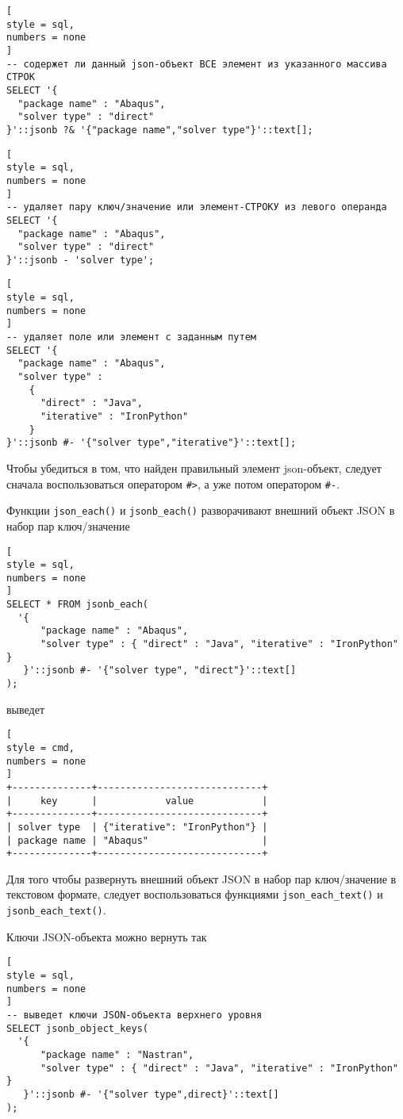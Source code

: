 \documentclass[%
	11pt,
	a4paper,
	utf8,
		]{article}
\begin{document}
\begin{lstlisting}[
style = sql, 
numbers = none
]
-- содержет ли данный json-объект ВСЕ элемент из указанного массива СТРОК
SELECT '{
  "package name" : "Abaqus",
  "solver type" : "direct"
}'::jsonb ?& '{"package name","solver type"}'::text[];
\end{lstlisting}

\begin{lstlisting}[
style = sql, 
numbers = none
]
-- удаляет пару ключ/значение или элемент-СТРОКУ из левого операнда 
SELECT '{
  "package name" : "Abaqus",
  "solver type" : "direct"
}'::jsonb - 'solver type';
\end{lstlisting}

\begin{lstlisting}[
style = sql, 
numbers = none
]
-- удаляет поле или элемент с заданным путем
SELECT '{
  "package name" : "Abaqus",
  "solver type" :
    {
      "direct" : "Java",
      "iterative" : "IronPython"
    }
}'::jsonb #- '{"solver type","iterative"}'::text[];
\end{lstlisting}

Чтобы убедиться в том, что найден правильный элемент json-объект, следует сначала воспользоваться оператором \verb|#>|, а уже потом оператором \verb|#-|.

Функции \texttt{json\_each()} и \texttt{jsonb\_each()} разворачивают внешний объект JSON в набор пар ключ/значение
\begin{lstlisting}[
style = sql, 
numbers = none
]
SELECT * FROM jsonb_each(
  '{
      "package name" : "Abaqus",
      "solver type" : { "direct" : "Java", "iterative" : "IronPython" }
   }'::jsonb #- '{"solver type", "direct"}'::text[]
);
\end{lstlisting}
выведет
\begin{lstlisting}[
style = cmd,
numbers = none
]
+--------------+-----------------------------+
|     key      |            value            |
+--------------+-----------------------------+
| solver type  | {"iterative": "IronPython"} |
| package name | "Abaqus"                    |
+--------------+-----------------------------+
\end{lstlisting}

Для того чтобы развернуть внешний объект JSON в набор пар ключ/значение в текстовом формате, следует воспользоваться функциями \texttt{json\_each\_text()} и \texttt{jsonb\_each\_text()}.

Ключи JSON-объекта можно вернуть так
\begin{lstlisting}[
style = sql, 
numbers = none
]
-- выведет ключи JSON-объекта верхнего уровня
SELECT jsonb_object_keys(
  '{
      "package name" : "Nastran",
      "solver type" : { "direct" : "Java", "iterative" : "IronPython" }   
   }'::jsonb #- '{"solver type",direct}'::text[]
);
\end{lstlisting}
\end{document}
